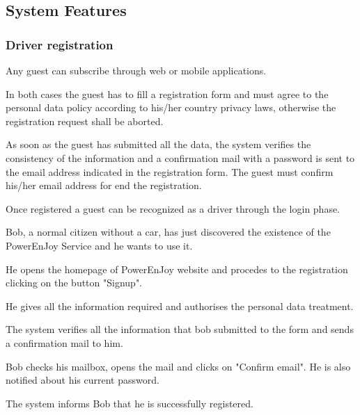 \subsection{System Features}

\subsubsection{Driver registration}

Any guest can subscribe through web or mobile applications.

In both cases the guest has to fill a registration form and must agree to the personal data policy according to his/her country privacy laws, otherwise the registration request shall be aborted.

As soon as the guest has submitted all the data, the system verifies the consistency of the information and a confirmation mail with a password is sent to the email address indicated in the registration form. The guest 
must confirm his/her email address for end the registration.

Once registered a guest can be recognized as a driver through the login phase.

Bob, a normal citizen without a car, has just discovered the existence of the PowerEnJoy Service and he wants to use it.

He opens the homepage of PowerEnJoy website and procedes to the registration clicking on the button "Signup".

He gives all the information required and authorises the personal data treatment. 

The system verifies all the information that bob submitted to the form and sends a confirmation mail to him.

Bob checks his mailbox, opens the mail and clicks on "Confirm email". He is also notified about his current password.

The system informs Bob that he is successfully registered.

